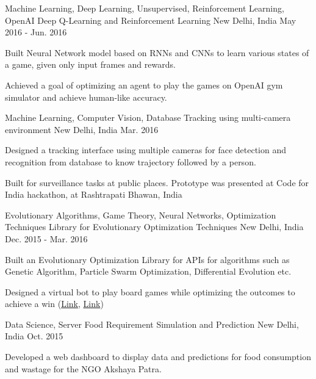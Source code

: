 \begin{cventries}
  \cventry
    {Machine Learning, Deep Learning, Unsupervised, Reinforcement Learning, OpenAI}
    {Deep Q-Learning and Reinforcement Learning}
    {New Delhi, India}
    {May 2016 - Jun. 2016}
    {
      \begin{cvitems}
        \item {Built Neural Network model based on RNNs and CNNs to learn various states of a game, given only input frames and rewards.}
        \item {Achieved a goal of optimizing an agent to play the games on OpenAI gym simulator and achieve human-like accuracy.}
      \end{cvitems}
    }
  \cventry
    {Machine Learning, Computer Vision, Database}
    {Tracking using multi-camera environment}
    {New Delhi, India}
    {Mar. 2016}
    {
      \begin{cvitems}
        \item {Designed a tracking interface using multiple cameras for face detection and recognition from database to know trajectory followed by a person.}
        \item {Built for surveillance tasks at public places. Prototype was presented at Code for India hackathon, at Rashtrapati Bhawan, India}
      \end{cvitems}
    }
  \cventry
    {Evolutionary Algorithms, Game Theory, Neural Networks, Optimization Techniques}
    {Library for Evolutionary Optimization Techniques}
    {New Delhi, India}
    {Dec. 2015 - Mar. 2016}
    {
      \begin{cvitems}
        \item {Built an Evolutionary Optimization Library for APIs for algorithms such as Genetic Algorithm, Particle Swarm Optimization, Differential Evolution etc.}
        \item {Designed a virtual bot to play board games while optimizing the outcomes to achieve a win (\href{https://github.com/shubham1810/Mathematical_optimization}{Link}, \href{https://github.com/shubham1810/nn_tic_tac_toe}{Link})}
      \end{cvitems}
    }
  \cventry
    {Data Science, Server}
    {Food Requirement Simulation and Prediction}
    {New Delhi, India}
    {Oct. 2015}
    {
      \begin{cvitems}
        \item {Developed a web dashboard to display data and predictions for food consumption and wastage for the NGO Akshaya Patra.}

\end{cvitems}}
\end{cventries}
